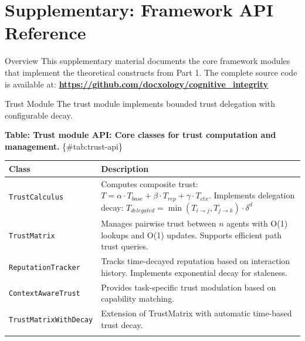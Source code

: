 \documentclass[
  ignorenonframetext,
]{beamer}
\author{\texorpdfstring{}{}}
\date{}
\newcounter{none} %
\begin{document}
\begin{frame}
\newpage
\end{frame}

\section{Supplementary: Framework API
Reference}\label{sec:framework-api}

\begin{frame}{Overview}
\protect{}\label{overview}
This supplementary material documents the core framework modules that
implement the theoretical constructs from Part 1. The complete source
code is available at:
\textbf{\url{https://github.com/docxology/cognitive_integrity}}
\end{frame}

\begin{frame}[fragile]{Trust Module}
\protect{}\label{sec:trust-module-api}
The trust module implements bounded trust delegation with configurable
decay.

\textbf{Table: Trust module API: Core classes for trust computation and
management.} \{\#tab:trust-api\}

{\def\LTcaptype{none} %
\begin{longtable}[]{@{}
  >{\raggedright\arraybackslash}p{}
  >{\raggedright\arraybackslash}p{}@{}}
\toprule\noalign{}
\begin{minipage}[b]{\linewidth}\raggedright
Class
\end{minipage} & \begin{minipage}[b]{\linewidth}\raggedright
Description
\end{minipage} \\
\midrule\noalign{}
\endhead
\texttt{TrustCalculus} & Computes composite trust:
\(T = \alpha \cdot T_{base} + \beta \cdot T_{rep} + \gamma \cdot T_{ctx}\).
Implements delegation decay:
\(T_{delegated} = \min(T_{i \to j}, T_{j \to k}) \cdot \delta^d\) \\
\texttt{TrustMatrix} & Manages pairwise trust between \(n\) agents with
O(1) lookups and O(1) updates. Supports efficient path trust queries. \\
\texttt{ReputationTracker} & Tracks time-decayed reputation based on
interaction history. Implements exponential decay for staleness. \\
\texttt{ContextAwareTrust} & Provides task-specific trust modulation
based on capability matching. \\
\texttt{TrustMatrixWithDecay} & Extension of TrustMatrix with automatic
time-based trust decay. \\
\bottomrule\noalign{}
\end{longtable}
}


\end{frame}
\end{document}
